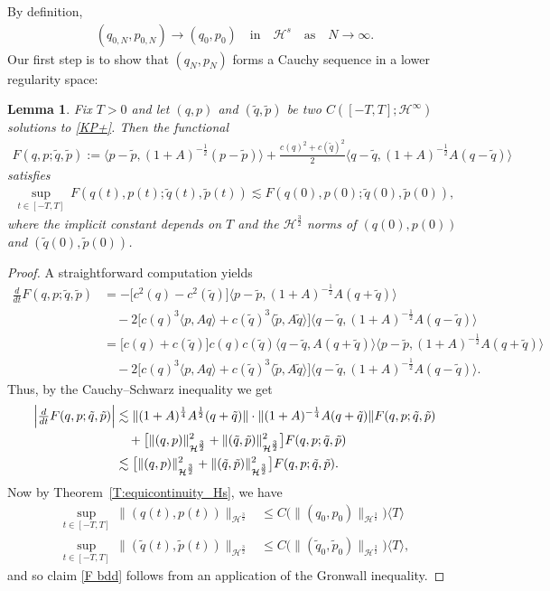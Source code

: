 \documentclass{amsart}
\newcommand{\qtq}[1]{\quad\text{#1}\quad}
\newtheorem{lemma}[theorem]{Lemma}
\theoremstyle{definition}
\numberwithin{equation}{section}
\renewcommand{\H}{\mathcal H}
\newcommand{\la}{\langle}
\newcommand{\ra}{\rangle}
\begin{document}
By definition,
\begin{align}\label{convg}
(q_{0,N}, p_{0,N}) \to (q_0, p_0) \qtq{in}  \H^s \qtq{as} N\to \infty.
\end{align}
Our first step is to show that $(q_N, p_N)$ forms a Cauchy sequence in a lower regularity space:

\begin{lemma}\label{L:F}
Fix $T>0$ and let $(q,p)$ and $(\tilde q, \tilde p)$ be two $C([-T,T]; \H^\infty)$ solutions to \eqref{KP+}.  Then the functional
\begin{align*}
F(q,p; \tilde q, \tilde p):=  \la p-\tilde p,  (1+A)^{-\frac12}(p-\tilde p)\ra+ \tfrac{c(q)^2+c(\tilde q)^2}2 \la q-\tilde q,  (1+A)^{-\frac12}A(q-\tilde q)\ra \end{align*}
satisfies
\begin{align}\label{F bdd}
\sup_{t\in[-T,T]}\, F(q(t),p(t); \tilde q(t), \tilde p(t))\lesssim F(q(0),p(0); \tilde q(0), \tilde p(0)),
\end{align}
where the implicit constant depends on $T$ and the $\H^{\frac32}$ norms of $(q(0),p(0))$ and $(\tilde q(0), \tilde p(0))$.
\end{lemma} 

\begin{proof}
A straightforward computation yields
\begin{align*}
\tfrac{d}{dt}F(q,p; \tilde q, \tilde p)
&= -\bigl[c^2(q)-c^2(\tilde q)\bigr] \langle p-\tilde p, (1+A)^{-\frac12}A(q+ \tilde q)\rangle \\
&\quad- 2\bigl[c(q)^3\la p, Aq\ra+ c(\tilde q)^3\la \tilde p, A\tilde q\ra\bigr] \langle q-\tilde q, (1+A)^{-\frac12}A(q-\tilde q)\ra\\
&= \bigl[c(q)+ c(\tilde q)\bigr] c(q) c(\tilde q) \la q-\tilde q, A(q+\tilde q)\ra  \langle p-\tilde p, (1+A)^{-\frac12}A(q+ \tilde q)\rangle\\
&\quad- 2\bigl[c(q)^3\la p, Aq\ra+c(\tilde q)^3\la \tilde p, A\tilde q\ra\bigr] \langle q-\tilde q, (1+A)^{-\frac12}A(q-\tilde q)\ra.
\end{align*}
Thus, by the Cauchy--Schwarz inequality we get 
\begin{align*}
\Bigl|\tfrac{d}{dt}F(q,p; \tilde q, \tilde p)\Bigr|
&\lesssim \|(1+A)^{\frac14}A^{\frac12}(q+\tilde q)\| \cdot \|(1+A)^{-\frac14}A(q+\tilde q)\| F(q,p; \tilde q, \tilde p)\\
&\quad +\bigl[\|(q,p)\|_{\H^{\frac32}}^2 +\|(\tilde q,\tilde p)\|_{\H^{\frac32}}^2\bigr] F(q,p; \tilde q, \tilde p)\\
&\lesssim \bigl[\|(q,p)\|_{\H^{\frac32}}^2 +\|(\tilde q,\tilde p)\|_{ \H^{\frac32}}^2\bigr] F(q,p; \tilde q, \tilde p).
\end{align*}
Now by Theorem~\ref{T:equicontinuity_Hs}, we have
\begin{align*}
\sup_{t\in [-T,T]} \,\|(q(t),p(t))\|_{\H^{\frac32}}& \leq C\bigl(\|(q_0,p_0)\|_{\H^{\frac32}}\bigr)\la T\ra \\
\sup_{t\in [-T,T]} \,\|(\tilde q(t),\tilde p(t))\|_{\H^{\frac32}}&\leq C(\|(\tilde q_0,\tilde p_0)\|_{\H^{\frac32}}\bigr)\la T\ra,
\end{align*}
and so claim \eqref{F bdd} follows from an application of the Gronwall inequality.
\end{proof}
\end{document}
